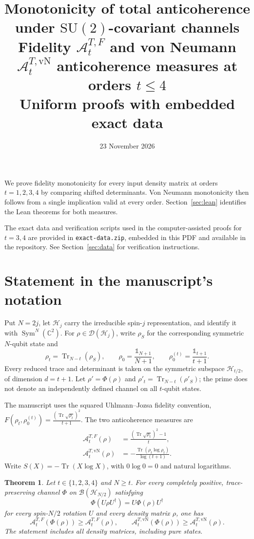 \documentclass[11pt,a4paper]{article}
\title{Monotonicity of total anticoherence\\under $\mathrm{SU}(2)$-covariant channels\\[3mm]\large Fidelity $\mathcal A_t^{T,F}$ and von Neumann $\mathcal A_t^{T,\mathrm{vN}}$ anticoherence measures at orders $t\le4$\\Uniform proofs with embedded exact data}
\author{}
\date{23 November 2026}
\newcommand{\A}{\mathcal A}
\newcommand{\Tr}{\operatorname{Tr}}
\newcommand{\id}{\mathds{1}}
\newcommand{\D}{\mathcal D}
\newtheorem{theorem}{Theorem}
\begin{document}
\maketitle
\noindent We prove fidelity monotonicity for every input density matrix at
orders $t=1,2,3,4$ by comparing shifted determinants. Von Neumann
monotonicity then follows from a single implication valid at every order.
Section~\ref{sec:lean} identifies the Lean theorems for both measures.

\medskip
\noindent The exact data and verification scripts used in the
computer-assisted proofs for $t=3,4$ are provided in \texttt{exact-data.zip},
embedded in this PDF and available in the repository.
See Section~\ref{sec:data} for verification instructions.
\clearpage
{\small\tableofcontents}
\clearpage
\section{Statement in the manuscript's notation}
Put $N=2j$, let $\mathcal H_j$ carry the irreducible spin-$j$
representation, and identify it with $\operatorname{Sym}^N(\mathbb C^2)$.
For $\rho\in\D(\mathcal H_j)$, write $\rho_S$ for the corresponding
symmetric $N$-qubit state and
\[
 \rho_t=\Tr_{N-t}(\rho_S),\qquad
 \rho_0=\frac{\id_{N+1}}{N+1},\qquad
 \rho_0^{(t)}=\frac{\id_{t+1}}{t+1}.
\]
Every reduced trace and determinant is taken on the symmetric subspace
$\mathcal H_{t/2}$, of dimension $d=t+1$. Let $\rho'=\Phi(\rho)$
and $\rho'_t=\Tr_{N-t}(\rho'_S)$; the prime does not denote an
independently defined channel on all $t$-qubit states.

The manuscript uses the squared Uhlmann--Jozsa fidelity convention,
$F(\rho_t,\rho_0^{(t)})=\frac{(\Tr\sqrt{\rho_t})^2}{t+1}$.
The two anticoherence measures are
\begin{align}
 \A_t^{T,F}(\rho)&=\frac{(\Tr\sqrt{\rho_t})^2-1}{t},\label{eq:F}\\
 \A_t^{T,\mathrm{vN}}(\rho)&=
 -\frac{\Tr(\rho_t\log\rho_t)}{\log(t+1)}.\label{eq:VN}
\end{align}
Write $S(X)=-\Tr(X\log X)$, with $0\log0=0$ and natural logarithms.

\begin{theorem}\label{thm:main}
Let $t\in\{1,2,3,4\}$ and $N\ge t$. For every completely positive,
trace-preserving channel $\Phi$ on $\mathcal B(\mathcal H_{N/2})$
satisfying
\[
 \Phi(U\rho U^\dagger)=U\Phi(\rho)U^\dagger
\]
for every spin-$N/2$ rotation $U$ and every density matrix $\rho$,
one has
\[
 \boxed{\A_t^{T,F}(\Phi(\rho))\ge\A_t^{T,F}(\rho),\qquad
 \A_t^{T,\mathrm{vN}}(\Phi(\rho))\ge\A_t^{T,\mathrm{vN}}(\rho).}
\]
The statement includes all density matrices, including pure states.
\end{theorem}
\end{document}
